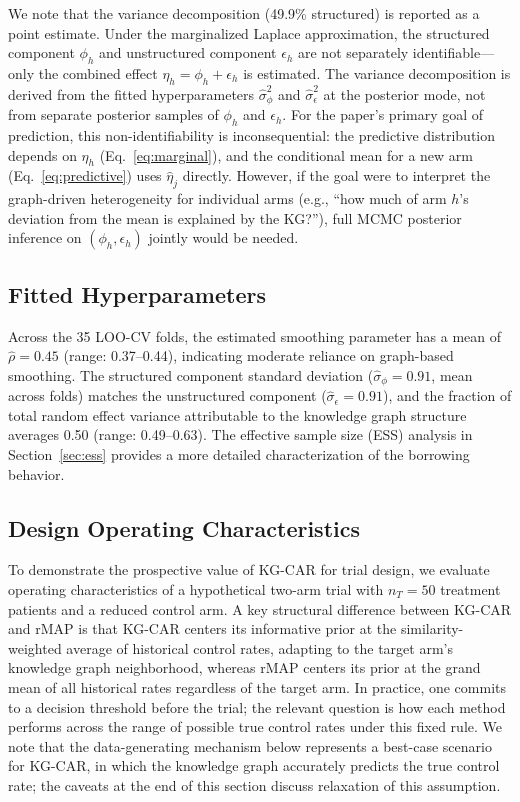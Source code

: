 \documentclass[12pt]{article}
\begin{document}
We note that the variance decomposition (49.9\% structured) is reported as a point estimate. Under the marginalized Laplace approximation, the structured component $\phi_h$ and unstructured component $\epsilon_h$ are not separately identifiable---only the combined effect $\eta_h = \phi_h + \epsilon_h$ is estimated. The variance decomposition is derived from the fitted hyperparameters $\hat{\sigma}_\phi^2$ and $\hat{\sigma}_\epsilon^2$ at the posterior mode, not from separate posterior samples of $\phi_h$ and $\epsilon_h$. For the paper's primary goal of prediction, this non-identifiability is inconsequential: the predictive distribution depends on $\eta_h$ (Eq.~\ref{eq:marginal}), and the conditional mean for a new arm (Eq.~\ref{eq:predictive}) uses $\hat{\eta}_j$ directly. However, if the goal were to interpret the graph-driven heterogeneity for individual arms (e.g., ``how much of arm $h$'s deviation from the mean is explained by the KG?''), full MCMC posterior inference on $(\phi_h, \epsilon_h)$ jointly would be needed.

\subsection{Fitted Hyperparameters}
\label{sec:fitted}

Across the 35 LOO-CV folds, the estimated smoothing parameter has a mean of $\hat{\rho} = 0.45$ (range: 0.37--0.44), indicating moderate reliance on graph-based smoothing. The structured component standard deviation ($\hat{\sigma}_\phi = 0.91$, mean across folds) matches the unstructured component ($\hat{\sigma}_\epsilon = 0.91$), and the fraction of total random effect variance attributable to the knowledge graph structure averages 0.50 (range: 0.49--0.63). The effective sample size (ESS) analysis in Section~\ref{sec:ess} provides a more detailed characterization of the borrowing behavior.

\subsection{Design Operating Characteristics}
\label{sec:design_oc}

To demonstrate the prospective value of KG-CAR for trial design, we evaluate operating characteristics of a hypothetical two-arm trial with $n_T = 50$ treatment patients and a reduced control arm. A key structural difference between KG-CAR and rMAP is that KG-CAR centers its informative prior at the similarity-weighted average of historical control rates, adapting to the target arm's knowledge graph neighborhood, whereas rMAP centers its prior at the grand mean of all historical rates regardless of the target arm. In practice, one commits to a decision threshold before the trial; the relevant question is how each method performs across the range of possible true control rates under this fixed rule. We note that the data-generating mechanism below represents a best-case scenario for KG-CAR, in which the knowledge graph accurately predicts the true control rate; the caveats at the end of this section discuss relaxation of this assumption.
\end{document}
